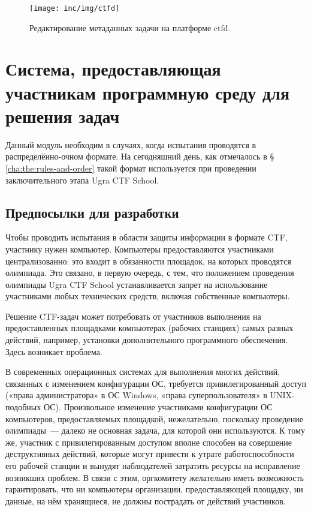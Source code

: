 \begin{figure}[h!]
  \centering
  \texttt{[image: inc/img/ctfd]}\\
  \caption{Редактирование метаданных задачи на платформе ctfd.}
  \label{fig:ctfd}
\end{figure}


\FloatBarrier



\section{Система, предоставляющая участникам программную среду для решения задач}

Данный модуль необходим в случаях, когда испытания проводятся в распределённо-очном формате. На сегодняшний день, как отмечалось в § \ref{cha:the:rules-and-order} такой формат используется при проведении заключительного этапа Ugra CTF School.

\subsection{Предпосылки для разработки}

Чтобы проводить испытания в области защиты информации в формате CTF, участнику нужен компьютер. Компьютеры предоставляются участниками централизованно: это входит в обязанности площадок, на которых проводятся олимпиада. Это связано, в первую очередь, с тем, что положением проведения олимпиады Ugra CTF School \cite{Olymp} устанавливается запрет на использование участниками любых технических средств, включая собственные компьютеры.

Решение CTF-задач может потребовать от участников выполнения на предоставленных площадками компьютерах (рабочих станциях) самых разных действий, например, установки дополнительного программного обеспечения. Здесь возникает проблема.

В современных операционных системах для выполнения многих действий, связанных с изменением конфигурации ОС, требуется привилегированный доступ («права администратора» в ОС Windows, «права суперпользователя» в UNIX-подобных ОС). Произвольное изменение участниками конфигурации ОС компьютеров, предоставляемых площадкой, нежелательно, поскольку проведение олимпиады~--- далеко не основная задача, для которой они используются. К тому же, участник с привилегированным доступом вполне способен на совершение деструктивных действий, которые могут привести к утрате работоспособности его рабочей станции и вынудят наблюдателей затратить ресурсы на исправление возникших проблем. В связи с этим, оргкомитету желательно иметь возможность гарантировать, что ни компьютеры организации, предоставляющей площадку, ни данные, на нём хранящиеся, не должны пострадать от действий участников.

